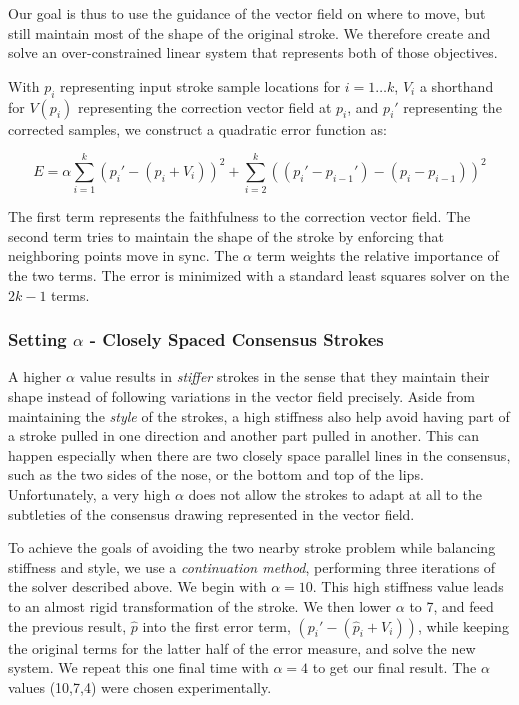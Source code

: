 Our goal is thus to use the guidance of the vector field on where to move, but still maintain most of the shape of the original stroke.  We therefore create and solve an over-constrained linear system that represents both of those objectives.

With $p_i$ representing input stroke sample locations for $i=1\ldots k$, $V_i$ a shorthand for $V(p_i)$ representing the correction vector field at $p_i$, and $p_i'$ representing the corrected samples, we construct a quadratic error function as:

\begin{equation}
E = \alpha \sum_{i=1}^k (p_i' - (p_i + V_i))^2 +  \sum_{i=2}^k ((p_i' - p_{i-1}') - (p_i - p_{i-1}))^2
\end{equation}

The first term represents the faithfulness to the correction vector field. The second term tries to maintain the shape of the stroke by enforcing that neighboring points move in sync. The $\alpha$ term weights the relative importance of the two terms. The error is minimized with a standard least squares solver on the $2k-1$ terms.

\subsubsection{Setting $\alpha$ - Closely Spaced Consensus Strokes}

A higher $\alpha$ value results in {\em stiffer} strokes in the sense that they maintain their shape instead of following variations in the vector field precisely. Aside from maintaining the {\em style} of the strokes, a high stiffness also help avoid having part of a stroke pulled in one direction and another part pulled in another. This can happen especially when there are two closely space parallel lines in the consensus, such as the two sides of the nose, or the bottom and top of the lips. Unfortunately, a very high $\alpha$ does not allow the strokes to adapt at all to the subtleties of the consensus drawing represented in the vector field.

To achieve the goals of avoiding the two nearby stroke problem while balancing stiffness and style, we use a {\em continuation method}, performing three iterations of the solver described above. We begin with $\alpha=10$. This high stiffness value leads to an almost rigid transformation of the stroke. We then lower $\alpha$ to 7, and feed the previous result, $\hat{p}$ into the first error term, $(p_i' - (\hat{p}_i + V_i))$, while keeping the original terms for the latter half of the error measure, and solve the new system. We repeat this one final time with $\alpha=4$ to get our final result. The $\alpha$ values (10,7,4) were chosen experimentally.

